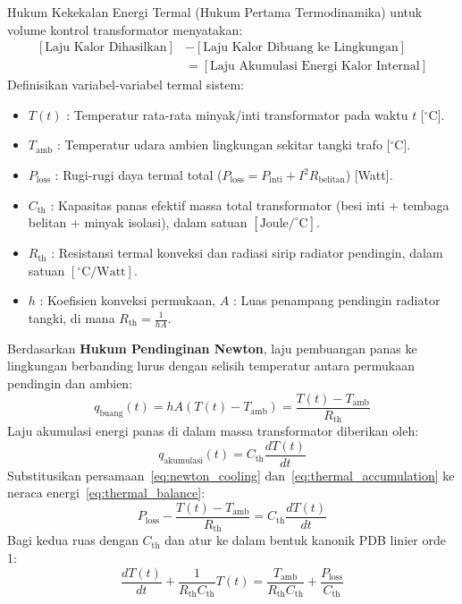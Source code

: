 \documentclass[11pt,a4paper]{article}
\theoremstyle{definition}
\begin{document}
Hukum Kekekalan Energi Termal (Hukum Pertama Termodinamika) untuk volume kontrol transformator menyatakan:
\begin{equation}
\begin{split}
    \left[ \text{Laju Kalor Dihasilkan} \right] &- \left[ \text{Laju Kalor Dibuang ke Lingkungan} \right] \\
    &= \left[ \text{Laju Akumulasi Energi Kalor Internal} \right]
\end{split}
\label{eq:thermal_balance}
\end{equation}
Definisikan variabel-variabel termal sistem:
\begin{itemize}[leftmargin=*]
    \item $T(t)$ : Temperatur rata-rata minyak/inti transformator pada waktu $t$ [$^\circ$C].
    \item $T_{\text{amb}}$ : Temperatur udara ambien lingkungan sekitar tangki trafo [$^\circ$C].
    \item $P_{\text{loss}}$ : Rugi-rugi daya termal total ($P_{\text{loss}} = P_{\text{inti}} + I^2 R_{\text{belitan}}$) [Watt].
    \item $C_{\text{th}}$ : Kapasitas panas efektif massa total transformator (besi inti + tembaga belitan + minyak isolasi), dalam satuan $[\text{Joule}/^\circ\text{C}]$.
    \item $R_{\text{th}}$ : Resistansi termal konveksi dan radiasi sirip radiator pendingin, dalam satuan $[^\circ\text{C}/\text{Watt}]$.
    \item $h$ : Koefisien konveksi permukaan, $A$ : Luas penampang pendingin radiator tangki, di mana $R_{\text{th}} = \frac{1}{h A}$.
\end{itemize}

Berdasarkan \textbf{Hukum Pendinginan Newton}, laju pembuangan panas ke lingkungan berbanding lurus dengan selisih temperatur antara permukaan pendingin dan ambien:
\begin{equation}
    q_{\text{buang}}(t) = h A \left( T(t) - T_{\text{amb}} \right) = \frac{T(t) - T_{\text{amb}}}{R_{\text{th}}}
    \label{eq:newton_cooling}
\end{equation}
Laju akumulasi energi panas di dalam massa transformator diberikan oleh:
\begin{equation}
    q_{\text{akumulasi}}(t) = C_{\text{th}} \frac{dT(t)}{dt}
    \label{eq:thermal_accumulation}
\end{equation}
Substitusikan persamaan~\eqref{eq:newton_cooling} dan~\eqref{eq:thermal_accumulation} ke neraca energi~\eqref{eq:thermal_balance}:
\begin{equation}
    P_{\text{loss}} - \frac{T(t) - T_{\text{amb}}}{R_{\text{th}}} = C_{\text{th}} \frac{dT(t)}{dt}
    \label{eq:thermal_ode_raw}
\end{equation}
Bagi kedua ruas dengan $C_{\text{th}}$ dan atur ke dalam bentuk kanonik PDB linier orde 1:
\begin{equation}
    \frac{dT(t)}{dt} + \frac{1}{R_{\text{th}} C_{\text{th}}} T(t) = \frac{T_{\text{amb}}}{R_{\text{th}} C_{\text{th}}} + \frac{P_{\text{loss}}}{C_{\text{th}}}
    \label{eq:thermal_ode_standard}
\end{equation}
\end{document}
